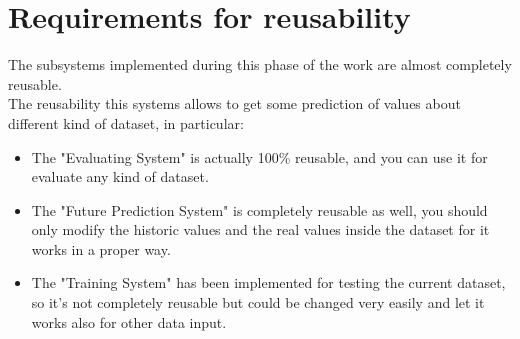 \newpage

\section{Requirements for reusability}
The subsystems implemented during this phase of the work are almost completely reusable.\\
The reusability this systems allows to get some prediction of values about different kind of dataset, in particular:
\begin{itemize}
\item The "Evaluating System" is actually 100\% reusable, and you can use it for evaluate any kind of dataset.
\item The "Future Prediction System" is completely reusable as well, you should only modify the historic values and the real values inside the dataset for it works in a proper way.
\item The "Training System" has been implemented for testing the current dataset, so it's not completely reusable but could be changed very easily and let it works also for other data input.
\end{itemize}


